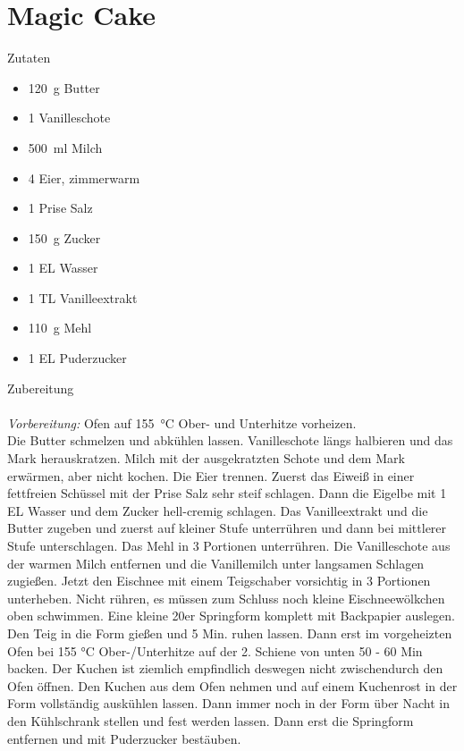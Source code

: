 \section*{Magic Cake}
\ihead{}\ohead{}
\cfoot{}
{\Large Zutaten}
\begin{multicols}{2}
\begin{itemize}
    \item \SI{120}{g} Butter
    \item \num{1} Vanilleschote
    \item \SI{500}{ml} Milch
    \item \num{4} Eier, zimmerwarm
    \item \num{1} Prise Salz
    \item \SI{150}{g} Zucker
    \item \num{1} EL Wasser
    \item \num{1} TL Vanilleextrakt
    \item \SI{110}{g} Mehl
    \item \num{1} EL Puderzucker
\end{itemize}
\end{multicols}
\noindent
{\Large Zubereitung}\\
\\
\textit{Vorbereitung:} Ofen auf \SI{155}{\celsius} Ober- und Unterhitze vorheizen.\\
Die Butter schmelzen und abkühlen lassen.
Vanilleschote längs halbieren und das Mark herauskratzen.
Milch mit der ausgekratzten Schote und dem Mark erwärmen, aber nicht kochen.
Die Eier trennen.
Zuerst das Eiweiß in einer fettfreien Schüssel mit der Prise Salz sehr steif schlagen.
Dann die Eigelbe mit 1 EL Wasser und dem Zucker hell-cremig schlagen.
Das Vanilleextrakt und die Butter zugeben und zuerst auf kleiner Stufe unterrühren und dann bei mittlerer Stufe unterschlagen.
Das Mehl in 3 Portionen unterrühren.
Die Vanilleschote aus der warmen Milch entfernen und die Vanillemilch unter langsamen Schlagen zugießen.
Jetzt den Eischnee mit einem Teigschaber vorsichtig in 3 Portionen unterheben. 
Nicht rühren, es müssen zum Schluss noch kleine Eischneewölkchen oben schwimmen.
Eine kleine 20er Springform komplett mit Backpapier auslegen.
Den Teig in die Form gießen und 5 Min. ruhen lassen.
Dann erst im vorgeheizten Ofen bei 155 °C Ober-/Unterhitze auf der 2. Schiene von unten 50 - 60 Min backen.
Der Kuchen ist ziemlich empfindlich deswegen nicht zwischendurch den Ofen öffnen.
Den Kuchen aus dem Ofen nehmen und auf einem Kuchenrost in der Form vollständig auskühlen lassen.
Dann immer noch in der Form über Nacht in den Kühlschrank stellen und fest werden lassen.
Dann erst die Springform entfernen und mit Puderzucker bestäuben.

